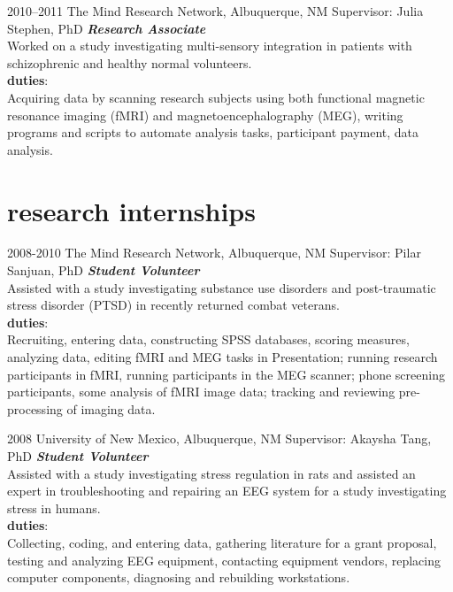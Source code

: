 \documentclass[]{friggeri-cv} %
\begin{document}
\begin{entrylist}
\entry
{\footnotesize{2010--2011}}
{The Mind Research Network, Albuquerque, NM \textemdash Supervisor: Julia Stephen, PhD}
{}
{\emph{\textbf{Research Associate}} \\
Worked on a study investigating multi-sensory integration in
patients with schizophrenic and healthy normal volunteers. \\
\textbf{duties}:\\
Acquiring data by scanning research subjects using both functional
magnetic resonance imaging (fMRI) and magnetoencephalography (MEG), writing
programs and scripts to automate analysis tasks, 
participant payment, data analysis.}
\end{entrylist}

\section{research internships}
\begin{entrylist}
\entry
{\footnotesize{2008-2010}}
{The Mind Research Network, Albuquerque, NM \textemdash Supervisor: Pilar Sanjuan, PhD}
{}
{\emph{\textbf{Student Volunteer}} \\
Assisted with a study investigating substance use disorders and
post-traumatic stress disorder (PTSD) in recently returned combat veterans. \\
\textbf{duties}: \\
Recruiting, entering data, constructing SPSS databases, scoring
measures, analyzing data, editing fMRI and MEG tasks in Presentation; running research
participants in fMRI, running participants in the MEG scanner; phone screening participants,
some analysis of fMRI image data; tracking and reviewing pre-processing of imaging data.}
\end{entrylist}

\begin{entrylist}
\entry
{\footnotesize{2008}}
{University of New Mexico, Albuquerque, NM \textemdash Supervisor: Akaysha Tang, PhD}
{}
{\textbf{\emph{Student Volunteer}} \\
Assisted with a study investigating stress regulation in rats and assisted an
expert in troubleshooting and repairing an EEG system for a study investigating stress in
humans. \\
\textbf{duties}: \\
Collecting, coding, and entering data, gathering literature for a grant
proposal, testing and analyzing EEG equipment, contacting equipment vendors, replacing
computer components, diagnosing and rebuilding workstations.}
\end{entrylist}
\end{document}
